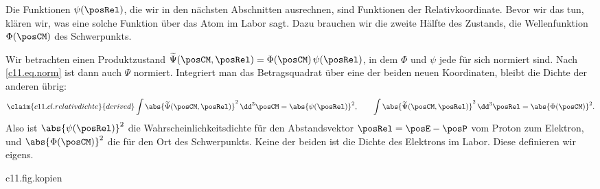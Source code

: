 Die Funktionen $\psi(\posRel)$, die wir in den nächsten Abschnitten ausrechnen, sind
Funktionen der Relativkoordinate. Bevor wir das tun, klären wir, was eine solche
Funktion über das Atom im Labor sagt. Dazu brauchen wir die zweite Hälfte des Zustands,
die Wellenfunktion $\Phi(\posCM)$ des Schwerpunkts.

Wir betrachten einen Produktzustand
$\widetilde{\Psi}(\posCM, \posRel) = \Phi(\posCM)\,\psi(\posRel)$, in dem $\Phi$ und
$\psi$ jede für sich normiert sind. Nach \eqref{c11.eq.norm} ist dann auch $\Psi$
normiert. Integriert man das Betragsquadrat über eine der beiden neuen Koordinaten,
bleibt die Dichte der anderen übrig:
\begin{equation}\label{c11.eq.relativdichte}\claim{c11.cl.relativdichte}{derived}
  \int \abs{\widetilde{\Psi}(\posCM, \posRel)}^2 \,\dd^3\posCM = \abs{\psi(\posRel)}^2,
  \qquad
  \int \abs{\widetilde{\Psi}(\posCM, \posRel)}^2 \,\dd^3\posRel = \abs{\Phi(\posCM)}^2.
\end{equation}
Also ist $\abs{\psi(\posRel)}^2$ die Wahrscheinlichkeitsdichte für den Abstandsvektor
$\posRel = \posE - \posP$ vom Proton zum Elektron, und $\abs{\Phi(\posCM)}^2$ die für
den Ort des Schwerpunkts. Keine der beiden ist die Dichte des Elektrons im Labor. Diese
definieren wir eigens.


\begin{tpcfigure}{c11.fig.kopien}
  \caption{Wie die Dichte des Elektrons im Labor zustande kommt, als Schema; Längen und Strichstärken bedeuten nichts. Jeder mögliche Ort des Schwerpunkts (Kreuze) trägt eine skalierte Kopie der Relativdichte (Ringe), mit $g_b(\boldsymbol{y}) = b^{-3}g(\boldsymbol{y}/b)$, $g = \abs{\psi}^2$ und $b = \massP/\massTot$, und zwar mit dem Gewicht, mit dem dieser Ort im Schwerpunktszustand vorkommt. Die Summe aller Kopien ist $\densE$. Die Rechnung dazu folgt.}
\end{tpcfigure}

